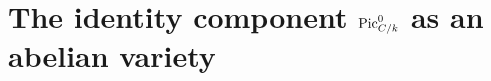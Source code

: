 \chapter{The identity component \(\operatorname{Pic}^0_{C/k}\) as an abelian variety}
\label{chap:Picard_Pic0AbelianVariety}

\providecommand{\tu}{\textup}

%
%
%

